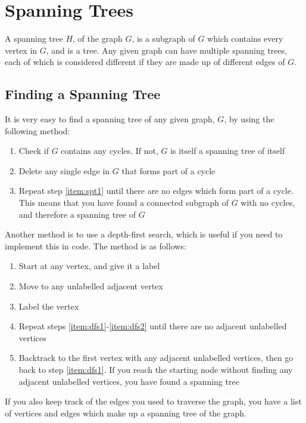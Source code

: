 \section*{Spanning Trees}

A spanning tree $H$, of the graph $G$, is a subgraph of $G$ which contains every vertex in $G$, and is a tree. Any given
 graph can have multiple spanning trees, each of which is considered different if they are made up of different edges
 of $G$.

\subsection*{Finding a Spanning Tree}

It is very easy to find a spanning tree of any given graph, $G$, by using the following method:
\begin{enumerate}[start=0]
  \item Check if $G$ contains any cycles. If not, $G$ is itself a spanning tree of itself
  \item\label{item:spt1} Delete any single edge in $G$ that forms part of a cycle
  \item Repeat step \ref*{item:spt1} until there are no edges which form part of a cycle. This means that you have found
   a connected subgraph of $G$ with no cycles, and therefore a spanning tree of $G$
\end{enumerate}

Another method is to use a depth-first search, which is useful if you need to implement this in code. The method is as
 follows:
\begin{enumerate}[start=0]
  \item Start at any vertex, and give it a label
  \item\label{item:dfs1} Move to any unlabelled adjacent vertex
  \item\label{item:dfs2} Label the vertex
  \item Repeat steps \ref*{item:dfs1}-\ref*{item:dfs2} until there are no adjacent unlabelled vertices
  \item Backtrack to the first vertex with any adjacent unlabelled vertices, then go back to step \ref*{item:dfs1}. If
   you reach the starting node without finding any adjacent unlabelled vertices, you have found a spanning tree
\end{enumerate}
If you also keep track of the edges you used to traverse the graph, you have a list of vertices and edges which make up
 a spanning tree of the graph.

